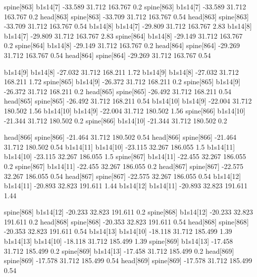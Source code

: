 spine[863]    b1s14[7]    -33.589    31.712    163.767    0.2
spine[863]    b1s14[7]    -33.589    31.712    163.767    0.2
head[863]    spine[863]    -33.709    31.712    163.767    0.54
head[863]    spine[863]    -33.709    31.712    163.767    0.54
b1s14[8]    b1s14[7]    -29.809    31.712    163.767    2.83
b1s14[8]    b1s14[7]    -29.809    31.712    163.767    2.83
spine[864]    b1s14[8]    -29.149    31.712    163.767    0.2
spine[864]    b1s14[8]    -29.149    31.712    163.767    0.2
head[864]    spine[864]    -29.269    31.712    163.767    0.54
head[864]    spine[864]    -29.269    31.712    163.767    0.54


b1s14[9]    b1s14[8]    -27.032    31.712    168.211    1.72
b1s14[9]    b1s14[8]    -27.032    31.712    168.211    1.72
spine[865]    b1s14[9]    -26.372    31.712    168.211    0.2
spine[865]    b1s14[9]    -26.372    31.712    168.211    0.2
head[865]    spine[865]    -26.492    31.712    168.211    0.54
head[865]    spine[865]    -26.492    31.712    168.211    0.54
b1s14[10]    b1s14[9]    -22.004    31.712    180.502    1.56
b1s14[10]    b1s14[9]    -22.004    31.712    180.502    1.56
spine[866]    b1s14[10]    -21.344    31.712    180.502    0.2
spine[866]    b1s14[10]    -21.344    31.712    180.502    0.2


head[866]    spine[866]    -21.464    31.712    180.502    0.54
head[866]    spine[866]    -21.464    31.712    180.502    0.54
b1s14[11]    b1s14[10]    -23.115    32.267    186.055    1.5
b1s14[11]    b1s14[10]    -23.115    32.267    186.055    1.5
spine[867]    b1s14[11]    -22.455    32.267    186.055    0.2
spine[867]    b1s14[11]    -22.455    32.267    186.055    0.2
head[867]    spine[867]    -22.575    32.267    186.055    0.54
head[867]    spine[867]    -22.575    32.267    186.055    0.54
b1s14[12]    b1s14[11]    -20.893    32.823    191.611    1.44
b1s14[12]    b1s14[11]    -20.893    32.823    191.611    1.44


spine[868]    b1s14[12]    -20.233    32.823    191.611    0.2
spine[868]    b1s14[12]    -20.233    32.823    191.611    0.2
head[868]    spine[868]    -20.353    32.823    191.611    0.54
head[868]    spine[868]    -20.353    32.823    191.611    0.54
b1s14[13]    b1s14[10]    -18.118    31.712    185.499    1.39
b1s14[13]    b1s14[10]    -18.118    31.712    185.499    1.39
spine[869]    b1s14[13]    -17.458    31.712    185.499    0.2
spine[869]    b1s14[13]    -17.458    31.712    185.499    0.2
head[869]    spine[869]    -17.578    31.712    185.499    0.54
head[869]    spine[869]    -17.578    31.712    185.499    0.54


